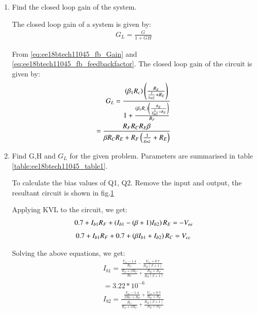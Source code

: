 \begin{enumerate}[label=\arabic*.,ref=\theenumi]
\item Find the closed loop gain of the system.

\solution 

The closed loop gain of a system is given by:
\begin{align}
    G_L = \frac{G}{1+GH}
\end{align}

From \eqref{eq:ee18btech11045_fb_Gain} and \eqref{eq:ee18btech11045_fb_feedbackfactor}. The closed loop gain of the circuit is given by:
\begin{align}
    G_L = \frac{\left(\beta_1 R_c\right) \left(\frac{R_E}{\frac{1}{g_{m2}} + R_E}\right)}{1 + \frac{\left(\beta_1 R_c\right) \left(\frac{R_E}{\frac{1}{g_{m2}} + R_E}\right)}{R_F}}
    \\
    = \frac{R_FR_CR_E\beta}{\beta R_C R_E + R_F\left(\frac{1}{g_{m2}}+R_E\right)}
    \label{eq:ee18btech11045_fb_clgain}
\end{align}


\item Find G,H and $G_L$ for the given problem. Parameters are summarised in table \ref{table:ee18btech11045_table1}.
%
\begin{table}[!ht]
\centering

\caption{}
\label{table:ee18btech11045_table1}
\end{table}

\solution

To calculate the bias values of Q1, Q2. Remove the input and output, the resultant circuit is shown in fig.\ref{fig:biascalc}

\begin{figure}[!ht]
	\begin{center}
			\resizebox{\columnwidth}{!}{}
	\end{center}
\caption{}
\label{fig:biascalc}
\end{figure}

Applying KVL to the circuit, we get:
\begin{align}
    0.7  + I_{b1}R_F + \left(I_{b1} - (\beta+1)I_{b2}\right)R_E = -V_{ee}
\end{align}
\begin{align}
    0.7 + I_{b1}R_F + 0.7 + \left(\beta I_{b1} + I_{b2}\right)R_C = V_{cc}
\end{align}

Solving the above equations, we get:
\begin{align}
    I_{b1} = \frac{\frac{V_{cc} - 1.4}{R_C} - \frac{V_{ee} +0.7}{R_E(\beta+1)}}{\frac{R_F + \beta R_C}{R_C} + \frac{R_E + R_F}{R_E(\beta + 1)}}
    \\
    = 3.22 * 10^{-6}
\end{align}
\begin{align}
    I_{b2} = \frac{\frac{V_{cc} - 1.4}{\beta R_C + R_F} + \frac{V_{ee}+0.7}{R_E+R_F}}{\frac{R_C}{R_F+\beta R_C} + \frac{R_E(\beta+1)}{R_E+R_F}}
\end{align}


\end{enumerate}
